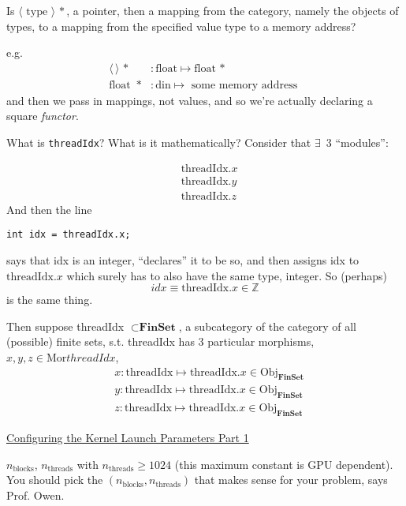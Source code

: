 \documentclass[10pt]{amsart}
\begin{document}
\begin{multicols*}{2}
Is $\langle \text{ type } \rangle \, *$, a pointer, then a mapping from the category, namely the objects of types, to a mapping from the specified value type to a memory address?

e.g.
\[
\begin{aligned}
  \langle \, \rangle \, * & : \text{float} \mapsto \text{float} \, * \\ 
  \text{float } \, * & : \text{din} \mapsto \text{ some memory address }
\end{aligned}
\]
and then we pass in mappings, not values, and so we're actually declaring a square \emph{functor}.

What is \verb|threadIdx|?  What is it mathematically?  Consider that $\exists \,$ 3 ``modules'':

\[
\begin{aligned}
  & \text{threadIdx}.x \\
  & \text{threadIdx}.y \\
  & \text{threadIdx}.z 
\end{aligned}
\]
And then the line
\begin{lstlisting}
int idx = threadIdx.x;
  \end{lstlisting}
says that idx is an integer, ``declares'' it to be so, and then assigns idx to $\text{threadIdx}.x$ which surely has to also have the same type, integer.  So (perhaps)
\[
idx \equiv \text{threadIdx}.x \in \mathbb{Z}
\]
is the same thing.

Then suppose threadIdx $\subset \mathbf{\text{FinSet}}$, a subcategory of the category of all (possible) finite sets, s.t. threadIdx has 3 particular morphisms, $x,y,z\in \text{Mor}threadIdx$,
\[
\begin{aligned}
  & x : \text{threadIdx} \mapsto \text{threadIdx}.x \in \text{Obj}_{\mathbf{\text{FinSet}}} \\ 
  & y : \text{threadIdx} \mapsto \text{threadIdx}.x \in \text{Obj}_{\mathbf{\text{FinSet}}} \\ 
  & z : \text{threadIdx} \mapsto \text{threadIdx}.x \in \text{Obj}_{\mathbf{\text{FinSet}}}  
\end{aligned}
\]

\href{https://classroom.udacity.com/courses/cs344/lessons/55120467/concepts/670742980923}{Configuring the Kernel Launch Parameters Part 1}

$n_{\text{blocks}}$, $n_{\text{threads}}$ with $n_{\text{threads}} \geq 1024$ (this maximum constant is GPU dependent).  You should pick the $(n_{\text{blocks}}, n_{\text{threads}})$ that makes sense for your problem, says Prof. Owen.  


\end{multicols*}
\end{document}

